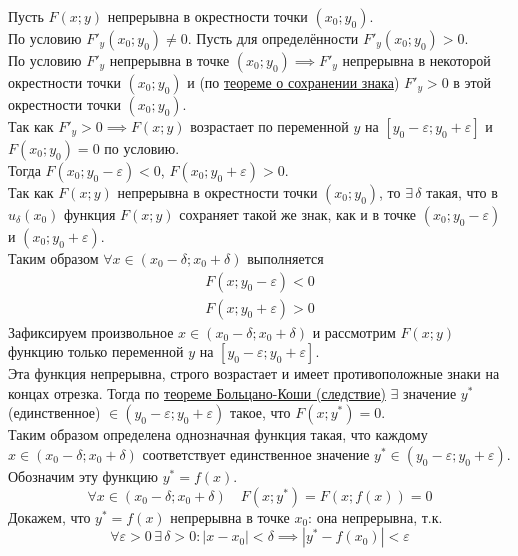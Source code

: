 \documentclass[12pt]{article}
\begin{document}
    \begin{adjustwidth}{1.5em}{1.5em}
        Пусть $F(x; y)$ непрерывна в окрестности точки $(x_0; y_0)$.\\
        По условию $F'_y(x_0; y_0) \ne 0$. Пусть для определённости $F'_y(x_0; y_0) > 0$.\\
        По условию $F'_y$ непрерывна в точке $(x_0; y_0) \implies F'_y$ непрерывна в некоторой окрестности точки $(x_0; y_0)$ и (по \hyperref[th:3.3.2]{теореме о сохранении знака}) $F'_y > 0$ в этой окрестности точки $(x_0; y_0)$.\\
        Так как $F'_y > 0 \implies F(x; y)$ возрастает по переменной $y$ на $[y_0 - \varepsilon; y_0 + \varepsilon]$ и $F(x_0; y_0) = 0$ по условию.\\
        Тогда $F(x_0; y_0 - \varepsilon) < 0$, $F(x_0; y_0 + \varepsilon) > 0$.\\
        Так как $F(x;y)$ непрерывна в окрестности точки $(x_0; y_0)$, то $\exists\, \delta$ такая, что в $u_\delta(x_0)$ функция $F(x; y)$ сохраняет такой же знак, как и в точке $(x_0; y_0 - \varepsilon)$ и $(x_0; y_0 + \varepsilon)$.\\
        Таким образом $\forall x \in (x_0 - \delta; x_0 + \delta)$ выполняется
        \begin{align*}
            F(x; y_0 - \varepsilon) < 0\\
            F(x; y_0 + \varepsilon) > 0
        \end{align*}
        Зафиксируем произвольное $x \in (x_0 - \delta; x_0 + \delta)$ и рассмотрим $F(x; y)$ функцию только переменной $y$ на $[ y_0 - \varepsilon; y_0 + \varepsilon ]$.\\
        Эта функция непрерывна, строго возрастает и имеет противоположные знаки на концах отрезка. Тогда по \hyperref[th:3.8.3]{теореме Больцано-Коши (следствие)} $\exists$ значение $y^*$ (единственное) $\in (y_0 - \varepsilon; y_0 + \varepsilon)$ такое, что $F(x; y^*) = 0$.\\
        Таким образом определена однозначная функция такая, что каждому $x \in (x_0 - \delta; x_0 + \delta)$ соответствует единственное значение $y^* \in (y_0 - \varepsilon; y_0 + \varepsilon)$.\\
        Обозначим эту функцию $y^* = f(x)$.
        \[ \forall x \in (x_0 - \delta; x_0 + \delta) \quad F(x; y^*) = F(x; f(x)) = 0 \]
        Докажем, что $y^* = f(x)$ непрерывна в точке $x_0$: она непрерывна, т.к. 
        \[ \forall \varepsilon > 0\,\exists\,\delta > 0 : |x - x_0| < \delta \implies |y^* - f(x_0)| < \varepsilon \]

\end{adjustwidth}
\end{document}
